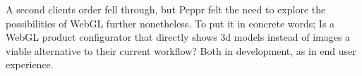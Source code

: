 A second clients order fell through, but Peppr felt the need to explore the possibilities of WebGL further nonetheless. To put it in concrete words; Is a WebGL product configurator that directly shows 3d models instead of images a viable alternative to their current workflow? Both in development, as in end user experience.





